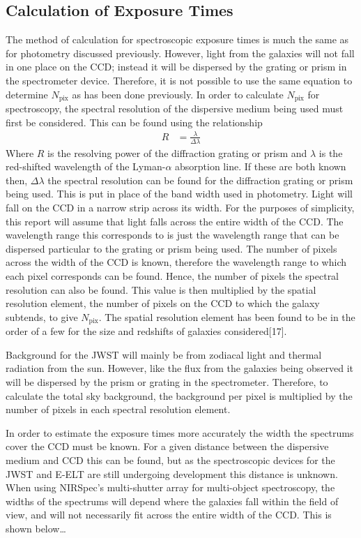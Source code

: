 	\subsection{Calculation of Exposure Times} %
	\label{sub:calculation_of_exposure_times}
		The method of calculation for spectroscopic exposure times is much the same as for photometry discussed previously. However, light from the galaxies will not fall in one place on the CCD; instead it will be dispersed by the grating or prism in the spectrometer device. Therefore, it is not possible to use the same equation to determine $N_\text{pix}$ as has been done previously. In order to calculate $N_\text{pix}$ for spectroscopy, the spectral resolution of the dispersive medium being used must first be considered. This can be found using the relationship
		\begin{align}
			R &= \frac{\lambda}{\Delta\lambda}
		\end{align}
		Where $R$ is the resolving power of the diffraction grating or prism and $\lambda$ is the red-shifted wavelength of the Lyman-$\alpha$ absorption line. If these are both known then, $\Delta\lambda$ the spectral resolution can be found for the diffraction grating or prism being used. This is put in place of the band width used in photometry. Light will fall on the CCD in a narrow strip across its width. For the purposes of simplicity, this report will assume that light falls across the entire width of the CCD. The wavelength range this corresponds to is just the wavelength range that can be dispersed particular to the grating or prism being used. The number of pixels across the width of the CCD is known, therefore the wavelength range to which each pixel corresponds can be found. Hence, the number of pixels the spectral resolution can also be found. This value is then multiplied by the spatial resolution element, the number of pixels on the CCD to which the galaxy subtends, to give $N_\text{pix}$. The spatial resolution element has been found to be in the order of a few for the size and redshifts of galaxies considered\cite{}[17].

		Background for the JWST will mainly be from zodiacal light and thermal radiation from the sun. However, like the flux from the galaxies being observed it will be dispersed by the prism or grating in the spectrometer. Therefore, to calculate the total sky background, the background per pixel is multiplied by the number of pixels in each spectral resolution element.

		In order to estimate the exposure times more accurately the width the spectrums cover the CCD must be known. For a given distance between the dispersive medium and CCD this can be found, but as the spectroscopic devices for the JWST and E-ELT are still undergoing development this distance is unknown. When using NIRSpec's multi-shutter array for multi-object spectroscopy, the widths of the spectrums will depend where the galaxies fall within the field of view, and will not necessarily fit across the entire width of the CCD. This is shown below…

